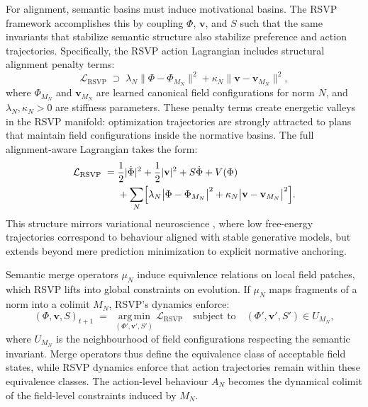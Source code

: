 \documentclass[12pt]{article}
\theoremstyle{definition}
\begin{document}
For alignment, semantic basins must induce motivational basins. The RSVP
framework accomplishes this by coupling $\Phi$, $\mathbf{v}$, and $S$ such that
the same invariants that stabilize semantic structure also stabilize preference
and action trajectories. Specifically, the RSVP action Lagrangian includes
structural alignment penalty terms:
\begin{equation}
\mathcal{L}_{\mathrm{RSVP}} \;\supset\;
  \lambda_N \bigl\|\Phi - \Phi_{M_N}\bigr\|^2
  + \kappa_N \bigl\|\mathbf{v} - \mathbf{v}_{M_N}\bigr\|^2,
\end{equation}
where $\Phi_{M_N}$ and $\mathbf{v}_{M_N}$ are learned canonical field
configurations for norm $N$, and $\lambda_N, \kappa_N > 0$ are stiffness
parameters. These penalty terms create energetic valleys in the RSVP manifold:
optimization trajectories are strongly attracted to plans that maintain field
configurations inside the normative basins. The full alignment-aware Lagrangian
takes the form:
\begin{align}
\mathcal{L}_{\mathrm{RSVP}} \;=\; &
  \frac{1}{2}|\dot{\Phi}|^2
  + \frac{1}{2}|\mathbf{v}|^2
  + S\dot{\Phi}
  + V(\Phi) \notag \\
& + \sum_N
  \Bigl[
    \lambda_N \bigl|\Phi - \Phi_{M_N}\bigr|^2
    + \kappa_N \bigl|\mathbf{v} - \mathbf{v}_{M_N}\bigr|^2
  \Bigr].
\end{align}
This structure mirrors variational neuroscience \citep{kirchhoff2018,friston2010},
where low free-energy trajectories correspond to behaviour aligned with stable
generative models, but extends beyond mere prediction minimization to explicit
normative anchoring.

Semantic merge operators $\mu_N$ induce equivalence relations on local field
patches, which RSVP lifts into global constraints on evolution. If $\mu_N$ maps
fragments of a norm into a colimit $M_N$, RSVP's dynamics enforce:
\begin{equation}
(\Phi, \mathbf{v}, S)_{t+1} \;=\;
  \operatorname*{arg\,min}_{(\Phi',\mathbf{v}',S')}
  \mathcal{L}_{\mathrm{RSVP}} \quad\text{subject to}\quad
  (\Phi', \mathbf{v}', S') \in U_{M_N},
\end{equation}
where $U_{M_N}$ is the neighbourhood of field configurations respecting the
semantic invariant. Merge operators thus define the equivalence class of
acceptable field states, while RSVP dynamics enforce that action trajectories
remain within these equivalence classes. The action-level behaviour $A_N$
becomes the dynamical colimit of the field-level constraints induced by $M_N$.
\end{document}
